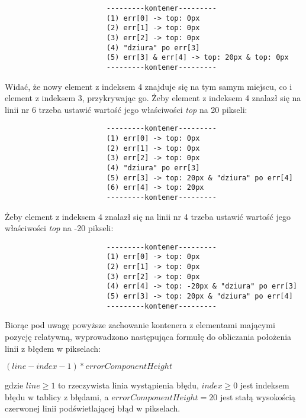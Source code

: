 \documentclass[a4paper,12pt]{book}
\theoremstyle{definition}
\begin{document}
\begin{verbatim}
                        ---------kontener---------
                        (1) err[0] -> top: 0px
                        (2) err[1] -> top: 0px
                        (3) err[2] -> top: 0px
                        (4) "dziura" po err[3]
                        (5) err[3] & err[4] -> top: 20px & top: 0px
                        ---------kontener---------
\end{verbatim}

\noindent Widać, że nowy element z indeksem 4 znajduje się na tym samym miejscu, co i element z indeksem 3, przykrywając go. Żeby element z indeksem 4 znalazł się na linii nr 6 trzeba ustawić wartość jego właściwości \textit{top} na 20 pikseli: 

\begin{verbatim}
                        ---------kontener---------
                        (1) err[0] -> top: 0px
                        (2) err[1] -> top: 0px
                        (3) err[2] -> top: 0px
                        (4) "dziura" po err[3]
                        (5) err[3] -> top: 20px & "dziura" po err[4]
                        (6) err[4] -> top: 20px
                        ---------kontener---------
\end{verbatim}

\noindent Żeby element z indeksem 4 znalazł się na linii nr 4 trzeba ustawić wartość jego właściwości \textit{top} na -20 pikseli: 

\begin{verbatim}
                        ---------kontener---------
                        (1) err[0] -> top: 0px
                        (2) err[1] -> top: 0px
                        (3) err[2] -> top: 0px
                        (4) err[4] -> top: -20px & "dziura" po err[3]
                        (5) err[3] -> top: 20px & "dziura" po err[4]
                        ---------kontener---------
\end{verbatim}

Biorąc pod uwagę powyższe zachowanie kontenera z elementami mającymi pozycję relatywną, wyprowadzono następująca formułę do obliczania położenia linii z błędem w pikselach:

\begin{center}
    $(line - index - 1) * errorComponentHeight$
\end{center}

\noindent gdzie $line \geq 1$ to rzeczywista linia wystąpienia błędu, $index \geq 0$ jest indeksem błędu w tablicy z błędami, a $errorComponentHeight = 20$ jest stałą wysokością czerwonej linii podświetlającej błąd w pikselach.
\end{document}
